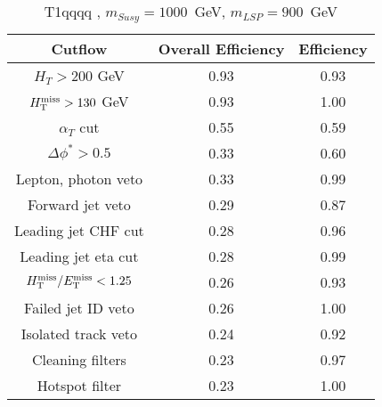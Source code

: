 \begin{longtable}{| c | c | c  | }
\caption{T1qqqq , $m_{Susy} = 1000 $~GeV, $m_{LSP} = 900$~GeV} \label{tab: T1qqqq  1000  900 } \\    \hline 
\textbf{Cutflow} & \textbf{Overall Efficiency} & \textbf{Efficiency}\\ \hline 
$H_{T} > 200$ GeV & 0.93 & 0.93\\ \hline 
$H_{\rm T}^{\rm miss} > 130$ GeV & 0.93 & 1.00\\ \hline 
$\alpha_{T}$ cut & 0.55 & 0.59\\ \hline 
$\Delta\phi^{*} > 0.5$ & 0.33 & 0.60\\ \hline 
Lepton, photon veto & 0.33 & 0.99\\ \hline 
Forward jet veto & 0.29 & 0.87\\ \hline 
Leading jet CHF cut & 0.28 & 0.96\\ \hline 
Leading jet eta cut & 0.28 & 0.99\\ \hline 
$H_{\rm T}^{\rm miss} / E_{\rm T}^{\rm miss} < 1.25$ & 0.26 & 0.93\\ \hline 
Failed jet ID veto & 0.26 & 1.00\\ \hline 
Isolated track veto & 0.24 & 0.92\\ \hline 
Cleaning filters & 0.23 & 0.97\\ \hline 
Hotspot filter & 0.23 & 1.00\\ \hline 
    \hline 
    \hline 
\end{longtable}
